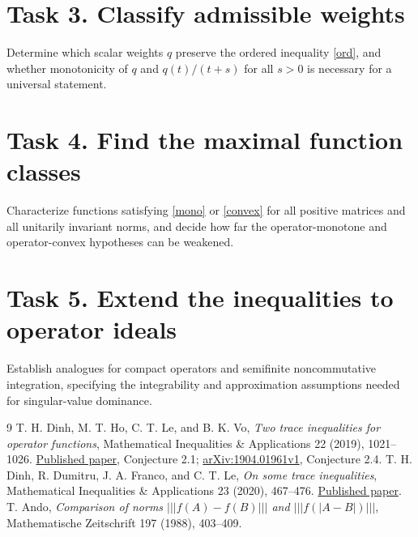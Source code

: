 \documentclass[11pt]{article}
\newcommand{\uin}[1]{\left|\!\left|\!\left|#1\right|\!\right|\!\right|}
\begin{document}
\section*{Task 3. Classify admissible weights}
Determine which scalar weights $q$ preserve the ordered inequality
\eqref{ord}, and whether monotonicity of $q$ and $q(t)/(t+s)$
for all $s>0$ is necessary for a universal statement.

\section*{Task 4. Find the maximal function classes}
Characterize functions satisfying \eqref{mono} or \eqref{convex}
for all positive matrices and all unitarily invariant norms, and
decide how far the operator-monotone and operator-convex
hypotheses can be weakened.

\section*{Task 5. Extend the inequalities to operator ideals}
Establish analogues for compact operators and semifinite
noncommutative integration, specifying the integrability and
approximation assumptions needed for singular-value dominance.

\enlargethispage{2\baselineskip}
\begin{thebibliography}{9}
 T. H. Dinh, M. T. Ho, C. T. Le, and B. K. Vo,
\emph{Two trace inequalities for operator functions},
Mathematical Inequalities \& Applications 22 (2019), 1021--1026.
\href{https://files.ele-math.com/articles/mia-22-69.pdf}{Published paper},
Conjecture 2.1; \href{https://arxiv.org/abs/1904.01961}{arXiv:1904.01961v1},
Conjecture 2.4.
 T. H. Dinh, R. Dumitru, J. A. Franco, and C. T. Le,
\emph{On some trace inequalities}, Mathematical Inequalities
\& Applications 23 (2020), 467--476.
\href{https://files.ele-math.com/articles/mia-23-38.pdf}{Published paper}.
 T. Ando, \emph{Comparison of norms
$\uin{f(A)-f(B)}$ and $\uin{f(|A-B|)}$},
Mathematische Zeitschrift 197 (1988), 403--409.
\end{thebibliography}
\end{document}
